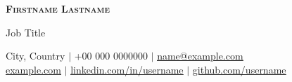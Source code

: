 
\begin{center}
    \textbf{\Huge \scshape Firstname Lastname} \\ \vspace{1pt}

    \vspace{0.2cm}
    Job Title
    \vspace{0.2cm}

    \small City, Country $|$ +00 000 0000000 $|$ \href{mailto:name@example.com}{\underline{name@example.com}}
    \\[0.1cm]
    \href{https://example.com}{\underline{example.com}} $|$
    \href{https://www.linkedin.com/in/username/}{\underline{linkedin.com/in/username}} $|$
    \href{https://github.com/username}{\underline{github.com/username}}
\end{center}
